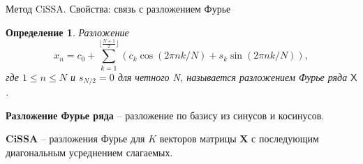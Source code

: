 \documentclass[notheorems, handout]{beamer}
\newtheorem{definition}{Определение}
\newcommand{\CISSA}{\textbf{CiSSA}}
\newcommand{\TS}{\mathsf{X}}
\begin{document}
	\begin{frame}{Метод CiSSA. Свойства: связь с разложением Фурье}
		\begin{definition}
			Разложение
			\begin{equation*}
				\label{eq:fourier}
				x_n = c_0 + \sum\limits_{k = 1}^{\lfloor \frac{N+1}{2} \rfloor}\left(c_k \cos(2\pi n k / N) + s_k \sin(2\pi n k / N) \right),
			\end{equation*}
			где $1 \leq n \leq N$ и $s_{N/2} = 0 $ для четного N, называется разложением Фурье ряда $\TS$. 
		\end{definition}
			\textbf{Разложение Фурье ряда} -- разложение по базису из синусов и косинусов.

			\medskip
			$\CISSA$ -- разложения Фурье для $K$ векторов матрицы $\mathbf X$ с последующим диагональным усреднением слагаемых.
		
	\end{frame}

	

		
		
	
		
	
\end{document}
